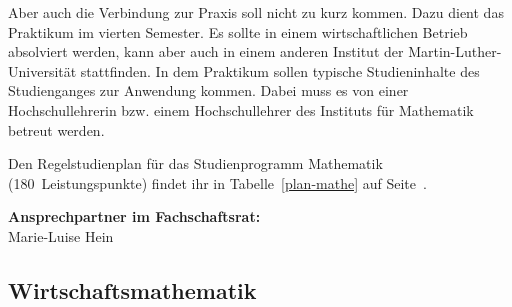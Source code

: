 Aber auch die Verbindung zur Praxis soll nicht zu kurz kommen.
Dazu dient das Praktikum im vierten Semester.
Es sollte in einem wirtschaftlichen Betrieb absolviert werden, kann aber auch in einem anderen Institut der Martin-Luther-Universität stattfinden.
In dem Praktikum sollen typische Studieninhalte des Studienganges zur Anwendung kommen.
Dabei muss es von einer Hochschullehrerin bzw. einem Hochschullehrer des Instituts für Mathematik betreut werden.

Den Regelstudienplan für das Studienprogramm Mathematik (180~Leistungspunkte) findet ihr in Tabelle~\ref{plan-mathe} auf Seite~\pageref{plan-mathe}.

\textbf{Ansprechpartner im Fachschaftsrat:}\\
Marie-Luise Hein\\



\subsection{Wirtschaftsmathematik}
\label{studiengang_wima}

